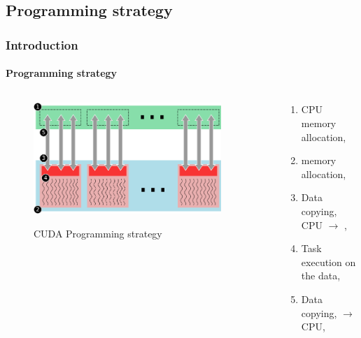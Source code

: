 \subsection{Programming strategy}
\begin{frame}
    \frametitle{Introduction}
    \framesubtitle{Programming strategy}

    \begin{columns}
        \begin{column}{0.5\textwidth}
            \begin{figure}
                \captionsetup{singlelinecheck=off}
                \centering
                \includegraphics[width=0.9\textwidth]{img/cuda-strategy}
                \label{fig:estrategia}
                \caption{CUDA Programming strategy}
            \end{figure}
        \end{column}
        \begin{column}{0.5\textwidth}
             \begin{enumerate}
                 \item CPU memory allocation,
                 \item {} memory allocation,
                 \item Data copying,  CPU $\rightarrow$ ,
                 \item Task execution on the data,
                 \item Data copying,  $\rightarrow$ CPU,
             \end{enumerate}
        \end{column}
    \end{columns}
\end{frame}

